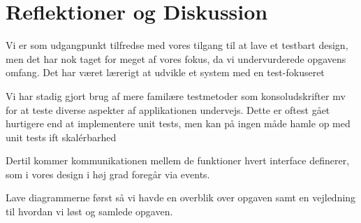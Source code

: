 
\section{Reflektioner og Diskussion}
Vi er som udgangpunkt tilfredse med vores tilgang til at lave et testbart design, men det har nok taget for meget af vores fokus, da vi undervurderede opgavens omfang. 
Det har været lærerigt at udvikle et system med en test-fokuseret

Vi har stadig gjort brug af mere familære testmetoder som konsoludskrifter mv for at teste diverse aspekter af applikationen undervejs. 
Dette er oftest gået hurtigere end at implementere unit tests, men kan på ingen måde hamle op med unit tests ift skalérbarhed

Dertil kommer kommunikationen mellem de funktioner hvert interface definerer, som i vores design i høj grad foregår via events.

Lave diagrammerne først så vi havde en overblik over opgaven samt en vejledning til hvordan vi løst og samlede opgaven. 

